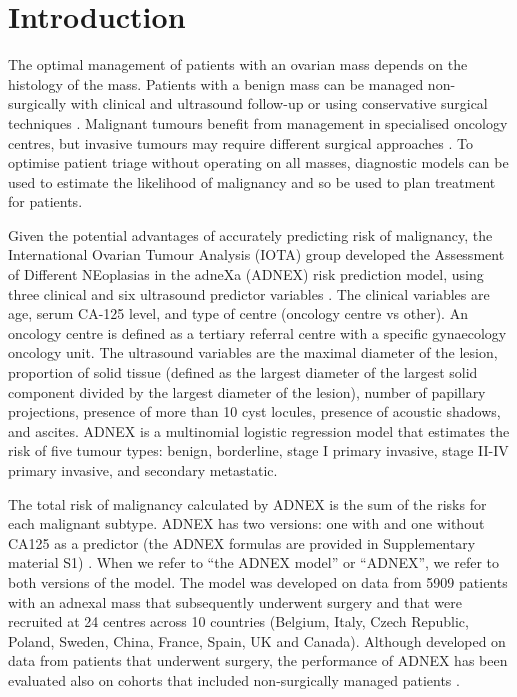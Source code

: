 \newpage

\section{Introduction}

The optimal management of patients with an ovarian mass depends on the histology
of the mass. Patients with a benign mass can be managed non-surgically with
clinical and ultrasound follow-up or using conservative surgical techniques 
 \cite{carleyLaparoscopyLaparotomyManagement2002,
froymanRiskComplicationsPatients2019}.
Malignant tumours benefit from management in specialised oncology centres, but invasive tumours may require different surgical approaches
 \cite{wooCentralisationServicesGynaecological2012,
timmermanESGOISUOGIOTA2021}.
To optimise patient triage without operating on all masses, diagnostic models
can be used to estimate the likelihood of malignancy and so be used to plan
treatment for patients.

Given the potential advantages of accurately predicting risk of malignancy, the
International Ovarian Tumour Analysis (\gls{IOTA}) group developed the Assessment of
Different NEoplasias in the adneXa (\gls{ADNEX}) risk prediction model, using three
clinical and six ultrasound predictor variables
 \cite{vancalsterEvaluatingRiskOvarian2014}. The clinical variables are age,
serum CA-125 level, and type of centre (oncology centre vs other). An oncology
centre is defined as a tertiary referral centre with a specific gynaecology
oncology unit. The ultrasound variables are the maximal diameter of the lesion,
proportion of solid tissue (defined as the largest diameter of the largest solid
component divided by the largest diameter of the lesion), number of papillary
projections, presence of more than 10 cyst locules, presence of acoustic
shadows, and ascites. \gls{ADNEX} is a multinomial logistic regression model that estimates the risk of five
tumour types: benign, borderline, stage I primary invasive, stage II-IV primary
invasive, and secondary metastatic.

The total risk of malignancy calculated by
\gls{ADNEX} is the sum of the risks for each malignant subtype. \gls{ADNEX} has two
versions: one with and one without CA125 as a predictor (the \gls{ADNEX} formulas are
provided in Supplementary material S1)
 \cite{vancalsterEvaluatingRiskOvarian2014}. When we refer to \enquote{the \gls{ADNEX} model}
or \enquote{\gls{ADNEX}}, we refer to both versions of the model. The model was developed on
data from 5909 patients with an adnexal mass that subsequently underwent surgery
and that were recruited at 24 centres across 10 countries (Belgium, Italy, Czech
Republic, Poland, Sweden, China, France, Spain, UK and Canada). Although
developed on data from patients that underwent surgery, the performance of \gls{ADNEX}
has been evaluated also on cohorts that included non-surgically managed patients
 \cite{vancalsterValidationModelsDiagnose2020,
hackExternalValidationORADS2022,
jeongValidationIOTAADNEXModel2020,
quarantaSurgeryBenignOvarian2020}.

